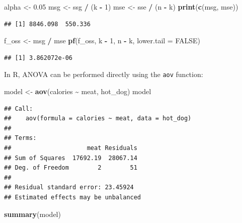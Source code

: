 \documentclass[
]{article}
\newenvironment{Shaded}{\begin{snugshade}}{\end{snugshade}}
\newcommand{\AttributeTok}[1]{\textcolor[rgb]{0.13,0.29,0.53}{#1}}
\newcommand{\ConstantTok}[1]{\textcolor[rgb]{0.56,0.35,0.01}{#1}}
\newcommand{\DecValTok}[1]{\textcolor[rgb]{0.00,0.00,0.81}{#1}}
\newcommand{\FloatTok}[1]{\textcolor[rgb]{0.00,0.00,0.81}{#1}}
\newcommand{\FunctionTok}[1]{\textcolor[rgb]{0.13,0.29,0.53}{\textbf{#1}}}
\newcommand{\NormalTok}[1]{#1}
\newcommand{\OtherTok}[1]{\textcolor[rgb]{0.56,0.35,0.01}{#1}}
\newcommand{\SpecialCharTok}[1]{\textcolor[rgb]{0.81,0.36,0.00}{\textbf{#1}}}
\begin{document}
\begin{Shaded}
\begin{Highlighting}[]
\NormalTok{alpha }\OtherTok{\textless{}{-}} \FloatTok{0.05}
\NormalTok{msg }\OtherTok{\textless{}{-}}\NormalTok{ ssg }\SpecialCharTok{/}\NormalTok{ (k }\SpecialCharTok{{-}} \DecValTok{1}\NormalTok{)}
\NormalTok{mse }\OtherTok{\textless{}{-}}\NormalTok{ sse }\SpecialCharTok{/}\NormalTok{ (n }\SpecialCharTok{{-}}\NormalTok{ k)}
\FunctionTok{print}\NormalTok{(}\FunctionTok{c}\NormalTok{(msg, mse))}
\end{Highlighting}
\end{Shaded}

\begin{verbatim}
## [1] 8846.098  550.336
\end{verbatim}

\begin{Shaded}
\begin{Highlighting}[]
\NormalTok{f\_oss }\OtherTok{\textless{}{-}}\NormalTok{ msg }\SpecialCharTok{/}\NormalTok{ mse}
\FunctionTok{pf}\NormalTok{(f\_oss, k }\SpecialCharTok{{-}} \DecValTok{1}\NormalTok{, n }\SpecialCharTok{{-}}\NormalTok{ k, }\AttributeTok{lower.tail =} \ConstantTok{FALSE}\NormalTok{)}
\end{Highlighting}
\end{Shaded}

\begin{verbatim}
## [1] 3.862072e-06
\end{verbatim}

In R, ANOVA can be performed directly using the \texttt{aov} function:

\begin{Shaded}
\begin{Highlighting}[]
\NormalTok{model }\OtherTok{\textless{}{-}} \FunctionTok{aov}\NormalTok{(calories }\SpecialCharTok{\textasciitilde{}}\NormalTok{ meat, hot\_dog)}
\NormalTok{model}
\end{Highlighting}
\end{Shaded}

\begin{verbatim}
## Call:
##    aov(formula = calories ~ meat, data = hot_dog)
## 
## Terms:
##                     meat Residuals
## Sum of Squares  17692.19  28067.14
## Deg. of Freedom        2        51
## 
## Residual standard error: 23.45924
## Estimated effects may be unbalanced
\end{verbatim}

\begin{Shaded}
\begin{Highlighting}[]
\FunctionTok{summary}\NormalTok{(model)}
\end{Highlighting}
\end{Shaded}
\end{document}
